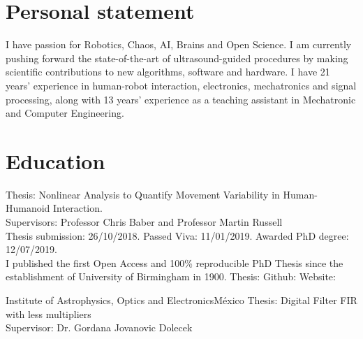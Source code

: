 \documentclass[10pt,a4paper,roman]{moderncv}
\begin{document}
\section{Personal statement}

\begin{changemargin}{2.4cm}{0.5cm}
I have passion for Robotics, Chaos, AI, Brains and Open Science.
I am currently pushing forward the state-of-the-art of 
ultrasound-guided procedures by making scientific contributions 
to new algorithms, software and hardware.
I have 21 years' experience in human-robot interaction, 
electronics, mechatronics and signal processing, along 
with 13 years' experience as a teaching assistant in 
Mechatronic and Computer Engineering. 
\end{changemargin}



\section{Education}
  {Thesis: Nonlinear Analysis to Quantify Movement Variability in Human-Humanoid Interaction.
	\\ Supervisors: Professor Chris Baber and  Professor Martin Russell
	\\ Thesis submission: 26/10/2018. Passed Viva: 11/01/2019. 
	Awarded PhD degree: 12/07/2019. \\
I published the first Open Access and 100\% 
reproducible PhD Thesis since the establishment of 
University of Birmingham in 1900.  
Thesis: \href{https://doi.org/10.5281/zenodo.3384145}{\faFilePdfO}
Github: \href{http://doi.org/10.5281/zenodo.3384281}{\faGithubAlt}
Website: \href{https://mxochicale-phd.github.io/site/}{\faExternalLink}
}

  {Institute of Astrophysics, Optics and Electronics}{M\'exico}{}
  {Thesis: Digital Filter FIR with less multipliers
  \href{https://github.com/mxochicale/publications/blob/master/thesis/M.Sc./doc/MPXochicale_MScThesis-2016.pdf}{\faFilePdfO}
  \href{https://github.com/mxochicale/publications/tree/master/thesis/M.Sc.}{\faGithubAlt}
  \\ Supervisor: Dr. Gordana Jovanovic Dolecek}
\end{document}
